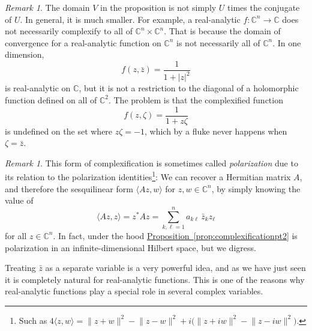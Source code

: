 \documentclass[12pt,openany]{book}
\newcommand{\linnprod}[2]{\langle #1 , #2 \rangle}
\newcommand{\sabs}[1]{\lvert {#1} \rvert}
\newcommand{\snorm}[1]{\lVert {#1} \rVert}
\newcommand{\C}{{\mathbb{C}}}
\newcommand{\myindex}[1]{#1\index{#1}}
\theoremstyle{plain}
\theoremstyle{remark}
\newtheorem{remark}[thm]{Remark}
\theoremstyle{definition}
\theoremstyle{exercise}
\theoremstyle{example}
\newcommand{\propref}[1]{\hyperref[#1]{Proposition~\ref*{#1}}}
\begin{document}
\begin{remark}
The domain $V$ in the proposition is not simply $U$ times the conjugate of $U$.
In general, it is much smaller.  For example, a real-analytic $f \colon \C^n \to
\C$ does not necessarily complexify to all of $\C^n \times \C^n$.
That is
because the domain of convergence for a real-analytic function on $\C^n$
is not necessarily all of $\C^n$.  In one dimension,
\begin{equation*}
f(z,\bar{z})
= \frac{1}{1+\sabs{z}^2}
\end{equation*}
is real-analytic on $\C$, but it is not a restriction to the diagonal
of a holomorphic function defined on all of $\C^2$.  The problem is that the complexified
function
\begin{equation*}
f(z,\zeta)
= \frac{1}{1+z \zeta}
\end{equation*}
is undefined on the set where $z \zeta = -1$, which by a fluke
never happens when $\zeta = \bar{z}$.
\end{remark}

\begin{remark}
This form of complexification is sometimes called
\emph{\myindex{polarization}} due to its relation to the polarization
identities\footnote{Such as $4 \linnprod{z}{w} =
\snorm{z+w}^2-\snorm{z-w}^2 +i \bigl( \snorm{z+iw}^2 - \snorm{z-iw}^2
\bigr)$.}:  We can recover a Hermitian matrix $A$,
and therefore the sesquilinear form $\linnprod{Az}{w}$ for
$z,w\in \C^n$, by simply knowing the value of
\begin{equation*}
\linnprod{Az}{z} = z^*Az = \sum_{k,\ell=1}^n a_{k\ell} \, \bar{z}_k z_\ell
\end{equation*}
for all $z \in \C^n$.  In fact, under the hood \propref{prop:complexificationpt2} is
polarization in an infinite-dimensional Hilbert space, but we digress.
\end{remark}

Treating $\bar{z}$ as a separate variable is a very powerful idea, and
as we have just seen it is completely natural for
real-analytic functions.  This is one of the reasons why real-analytic
functions play a special role in several complex variables.
\end{document}
